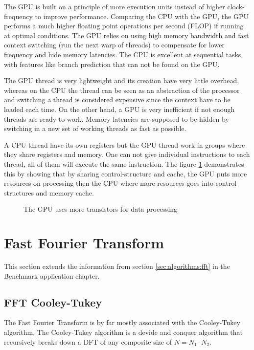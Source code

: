 The GPU is built on a principle of more execution units instead of higher clock-frequency to improve performance. Comparing the CPU with the GPU, the GPU performs a much higher floating point operations per second (FLOP) if running at optimal conditions. The GPU relies on using high memory bandwidth and fast context switching (run the next warp of threads) to compensate for lower frequency and hide memory latencies. The CPU is excellent at sequential tasks with features like branch prediction that can not be found on the GPU.

The GPU thread is very lightweight and its creation have very little overhead, whereas on the CPU the thread can be seen as an abstraction of the processor and switching a thread is considered expensive since the context have to be loaded each time. On the other hand, a GPU is very inefficient if not enough threads are ready to work. Memory latencies are supposed to be hidden by switching in a new set of working threads as fast as possible.

A CPU thread have its own registers but the GPU thread work in groups where they share registers and memory. One can not give individual instructions to each thread, all of them will execute the same instruction. The figure \ref{fig:gpu-vs-cpu} demonstrates this by showing that by sharing control-structure and cache, the GPU puts more resources on processing then the CPU where more resources goes into control structures and memory cache.

\begin{figure}
	\centering
	
	\caption{The GPU uses more transistors for data processing}
	\label{fig:gpu-vs-cpu}
\end{figure}

\section{Fast Fourier Transform}

This section extends the information from section \ref{sec:algorithms:fft} in the Benchmark application chapter.

\subsection{FFT Cooley-Tukey}

The Fast Fourier Transform is by far mostly associated with the Cooley-Tukey algorithm. The Cooley-Tukey algorithm is a devide and conquer algorithm that recursively breaks down a DFT of any composite size of $N = N_1{\cdot}N_2$.

